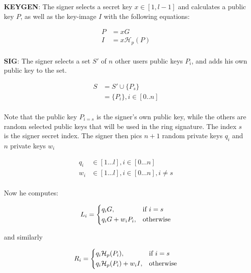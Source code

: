 \hfill \break


\hfill \break\textbf{KEYGEN}: 
The signer selects a secret key $x \in [1, l-1]$ and calculates a public key $P$, as well as the key-image $I$ with the following equations:

\begin{equation}
\begin{split}
P &= xG\\
I &= x\mathcal{H}_p(P)\\ 
\end{split}
\end{equation}

\textbf{SIG}: 
The signer selects a set $S'$ of $n$ other users public keys $P_i$, and adds his own public key to the set. 

\begin{equation}
\begin{split}
S &= S' \cup \{P_s\}\\
 &= \{P_i\}, i \in [0..n] \\
\end{split}
\end{equation}

Note that the public key $P_{i=s}$ is the signer's own public key, while the others are random selected public keys that will be used in the ring signature. The index $s$ is the signer secret index. The signer then pics $n+1$ random private keys $q_i$ and $n$ private keys $w_i$

\begin{equation}
\begin{split}
q_i &\in [1...l],  i \in [0...n] \\
w_i &\in [1...l],  i \in [0...n], i \not= s \\
\end{split}
\end{equation}

Now he computes:

\[
L_i= 
\begin{dcases}
q_iG,& \text{if } i = s\\
q_iG+w_iP_i,              & \text{otherwise}
\end{dcases}
\]

and similarly

\[
R_i= 
\begin{dcases}
q_i\mathcal{H}_p(P_i),& \text{if } i = s\\
q_i\mathcal{H}_p(P_i)+w_iI,              & \text{otherwise}
\end{dcases}
\]

